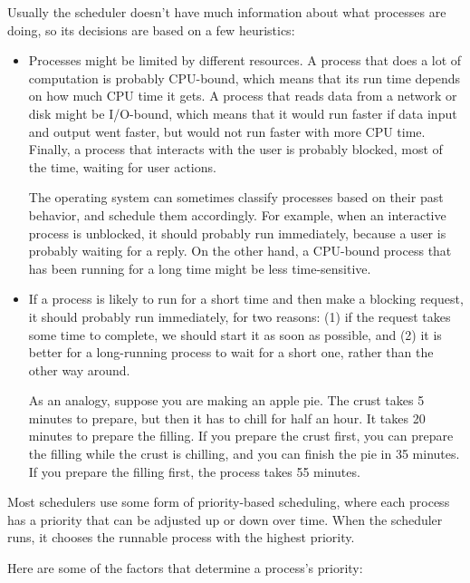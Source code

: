 \documentclass[12pt]{book}
\begin{document}
Usually the scheduler doesn't have much information about what
processes are doing, so its decisions are based on a few
heuristics:

\begin{itemize}

\item Processes might be limited by different resources.  A process
that does a lot of computation is probably CPU-bound, which means that
its run time depends on how much CPU time it gets.  A process that
reads data from a network or disk might be I/O-bound, which means that
it would run faster if data input and output went faster, but would not
run faster with more CPU time.  Finally, a process that interacts with
the user is probably blocked, most of the time, waiting for user actions.

The operating system can sometimes classify processes based on their
past behavior, and schedule them accordingly.  For example, when an
interactive process is unblocked, it should probably run immediately,
because a user is probably waiting for a reply.  On the other hand,
a CPU-bound process that has been running for a long time might be
less time-sensitive.

\item If a process is likely to run for a short time and then make
a blocking request, it should probably run immediately, for two reasons:
(1) if the request takes some time to complete, we should start it as soon
as possible, and (2) it is better for a long-running process to wait
for a short one, rather than the other way around.

As an analogy, suppose you are making an apple pie.  The crust takes
5 minutes to prepare, but then it has to chill for half an hour.  It takes
20 minutes to prepare the filling.  If you prepare the crust first,
you can prepare the filling while the crust is chilling, and you can
finish the pie in 35 minutes.  If you prepare the filling first, the
process takes 55 minutes.

\end{itemize}

Most schedulers use some form of priority-based scheduling,
where each process has a priority that can be adjusted up or down
over time.  When the scheduler runs, it chooses the runnable process
with the highest priority.

Here are some of the factors that determine a process's priority:
\end{document}
